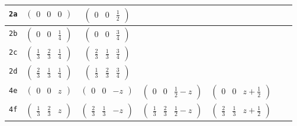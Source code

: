 \documentclass[fleqn,9pt,landscape]{jsarticle}
\begin{document}
\begin{center}
\begin{longtable}{ccccccc}
{\tt 2a} & $ \begin{pmatrix} 0 & 0 & 0 \end{pmatrix} $ & $ \begin{pmatrix} 0 & 0 & \frac{1}{2} \end{pmatrix} $ & $  $ & $  $ & $  $ & $  $ \\ \hline
{\tt 2b} & $ \begin{pmatrix} 0 & 0 & \frac{1}{4} \end{pmatrix} $ & $ \begin{pmatrix} 0 & 0 & \frac{3}{4} \end{pmatrix} $ & $  $ & $  $ & $  $ & $  $ \\ \hline
{\tt 2c} & $ \begin{pmatrix} \frac{1}{3} & \frac{2}{3} & \frac{1}{4} \end{pmatrix} $ & $ \begin{pmatrix} \frac{2}{3} & \frac{1}{3} & \frac{3}{4} \end{pmatrix} $ & $  $ & $  $ & $  $ & $  $ \\ \hline
{\tt 2d} & $ \begin{pmatrix} \frac{2}{3} & \frac{1}{3} & \frac{1}{4} \end{pmatrix} $ & $ \begin{pmatrix} \frac{1}{3} & \frac{2}{3} & \frac{3}{4} \end{pmatrix} $ & $  $ & $  $ & $  $ & $  $ \\ \hline
{\tt 4e} & $ \begin{pmatrix} 0 & 0 & z \end{pmatrix} $ & $ \begin{pmatrix} 0 & 0 & - z \end{pmatrix} $ & $ \begin{pmatrix} 0 & 0 & \frac{1}{2} - z \end{pmatrix} $ & $ \begin{pmatrix} 0 & 0 & z + \frac{1}{2} \end{pmatrix} $ & $  $ & $  $ \\ \hline
{\tt 4f} & $ \begin{pmatrix} \frac{1}{3} & \frac{2}{3} & z \end{pmatrix} $ & $ \begin{pmatrix} \frac{2}{3} & \frac{1}{3} & - z \end{pmatrix} $ & $ \begin{pmatrix} \frac{1}{3} & \frac{2}{3} & \frac{1}{2} - z \end{pmatrix} $ & $ \begin{pmatrix} \frac{2}{3} & \frac{1}{3} & z + \frac{1}{2} \end{pmatrix} $ & $  $ & $  $ \\ \hline

\end{longtable}
\end{center}
\end{document}
